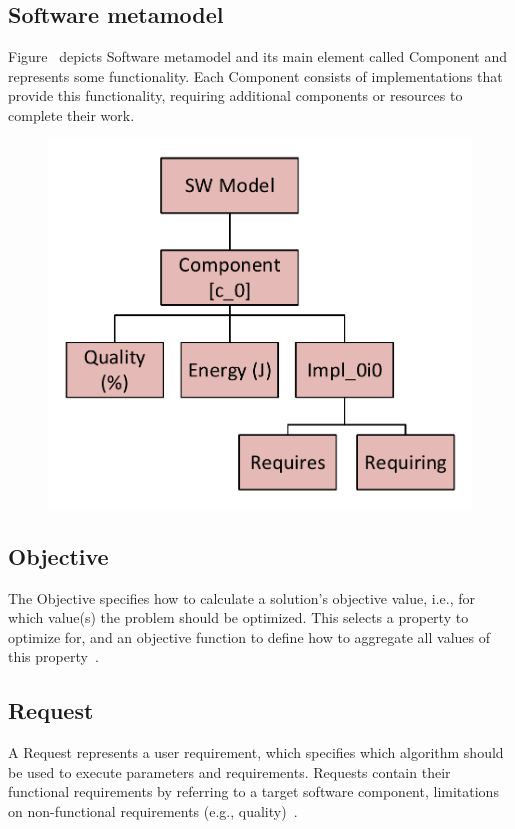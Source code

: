 \subsection{Software metamodel}
Figure~\label{fig:SWModel} depicts Software metamodel and its main element called Component and represents some functionality.
Each Component consists of implementations that provide this functionality, requiring additional components or resources to complete their work. 
\begin{figure}
	\centering
	\includegraphics[width=\textwidth]{images/SWModel}
	\caption{}
	\label{fig:SWModel}
\end{figure}

\subsection{Objective}
The Objective specifies how to calculate a solution's objective value, i.e., for which value(s) the problem should be optimized. This selects a property to optimize for, and an objective function to define how to aggregate all values of this property~\cite{gotz18}.

\subsection{Request}
A Request represents a user requirement, which specifies which algorithm should be used to execute parameters and requirements. Requests contain their functional requirements by referring to a target software component, limitations on non-functional requirements (e.g., quality)~\cite{gotz18}.

